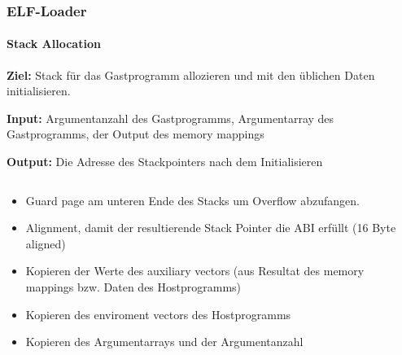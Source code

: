 \documentclass[german]{tum-presentation}
\begin{document}
\begin{frame}[fragile]
	\frametitle{ELF-Loader}
	\framesubtitle{Stack Allocation}
	\textbf{Ziel:} Stack für das Gastprogramm allozieren und mit den üblichen Daten initialisieren.

	\vspace{0.25cm}
	\textbf{Input:} Argumentanzahl des Gastprogramms, Argumentarray des Gastprogramms, der Output des memory mappings

	\textbf{Output:} Die Adresse des Stackpointers nach dem Initialisieren

	\pause
	\begin{columns}[c, onlytextwidth]
		\begin{column}{0.49\textwidth}
			\begin{itemize}
				\item<3-> Guard page am unteren Ende des Stacks um Overflow abzufangen.
				\item<3-> Alignment, damit der resultierende Stack Pointer die ABI erfüllt (16 Byte aligned)
				\item<3-> Kopieren der Werte des auxiliary vectors (aus Resultat des memory mappings bzw. Daten des Hostprogramms)
				\item<3-> Kopieren des enviroment vectors des Hostprogramms
				\item<3-> Kopieren des Argumentarrays und der Argumentanzahl
			\end{itemize}
		\end{column}

		\begin{column}{0.49\textwidth}


\end{column}
\end{columns}
\end{frame}
\end{document}
